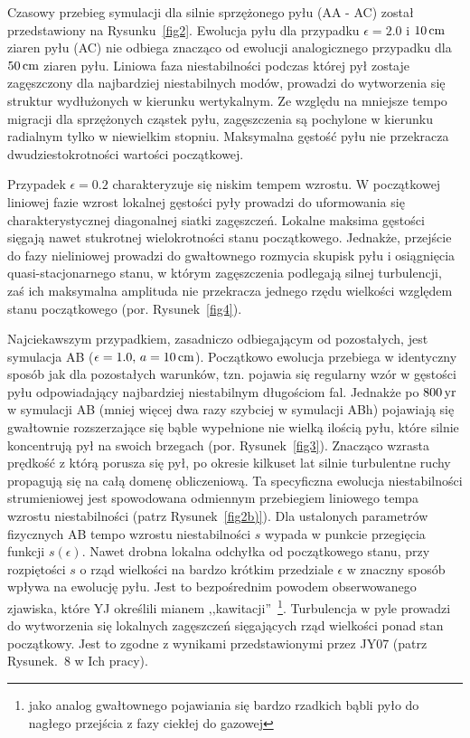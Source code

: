 Czasowy przebieg symulacji dla silnie sprzężonego pyłu (AA - AC) został
przedstawiony na Rysunku~\ref{fig2}. Ewolucja pyłu dla przypadku $\epsilon =
2.0$ i $10\hbox{$\thinspace\textrm{cm}$}$ ziaren pyłu (AC) nie odbiega znacząco od ewolucji analogicznego
przypadku dla $50\hbox{$\thinspace\textrm{cm}$}$ ziaren pyłu. Liniowa faza niestabilności podczas której
pył zostaje zagęszczony dla najbardziej niestabilnych modów, prowadzi do
wytworzenia się struktur wydłużonych w kierunku wertykalnym. Ze względu na
mniejsze tempo migracji dla sprzężonych cząstek pyłu, zagęszczenia są pochylone
w kierunku radialnym tylko w niewielkim stopniu. Maksymalna gęstość pyłu nie
przekracza dwudziestokrotności wartości początkowej.
\par Przypadek $\epsilon = 0.2$ charakteryzuje się niskim tempem wzrostu. W
początkowej liniowej fazie wzrost lokalnej gęstości pyły prowadzi do uformowania
się charakterystycznej diagonalnej siatki zagęszczeń. Lokalne maksima gęstości
sięgają nawet stukrotnej wielokrotności stanu początkowego. Jednakże, przejście
do fazy nieliniowej prowadzi do gwałtownego rozmycia skupisk pyłu i osiągnięcia
quasi-stacjonarnego stanu, w którym zagęszczenia podlegają silnej turbulencji,
zaś ich maksymalna amplituda nie przekracza jednego rzędu wielkości względem
stanu początkowego (por. Rysunek~\ref{fig4}).

\par Najciekawszym przypadkiem, zasadniczo odbiegającym od pozostałych, jest
symulacja AB ($\epsilon=1.0,\, a=10\hbox{$\thinspace\textrm{cm}$}$). Początkowo ewolucja przebiega w
identyczny sposób jak dla pozostałych warunków, tzn. pojawia się regularny wzór
w gęstości pyłu odpowiadający najbardziej niestabilnym długościom fal. Jednakże 
po $800\hbox{$\thinspace\textrm{yr}$}$ w symulacji AB (mniej więcej dwa razy szybciej w symulacji ABh)
pojawiają się gwałtownie rozszerzające się bąble wypełnione nie wielką ilością
pyłu, które silnie koncentrują pył na swoich brzegach (por. Rysunek~\ref{fig3}). 
Znacząco wzrasta prędkość z którą porusza się pył, po okresie kilkuset lat
silnie turbulentne ruchy propagują się na całą domenę obliczeniową. Ta
specyficzna ewolucja niestabilności strumieniowej jest spowodowana odmiennym
przebiegiem liniowego tempa wzrostu niestabilności (patrz Rysunek~\ref{fig2b)}).
Dla ustalonych parametrów fizycznych AB tempo wzrostu niestabilności $s$ wypada w
punkcie przegięcia funkcji $s(\epsilon)$. Nawet drobna lokalna odchyłka od
początkowego stanu, przy rozpiętości $s$ o rząd wielkości na bardzo krótkim
przedziale $\epsilon$ w znaczny sposób wpływa na ewolucję pyłu. Jest to
bezpośrednim powodem obserwowanego zjawiska, które YJ określili mianem
,,kawitacji''~\footnote{jako analog gwałtownego pojawiania się bardzo rzadkich
   bąbli pyło do nagłego przejścia z fazy ciekłej do gazowej}.
Turbulencja w pyle prowadzi do wytworzenia się lokalnych zagęszczeń sięgających
rząd wielkości ponad stan początkowy. Jest to zgodne z wynikami przedstawionymi
przez JY07 (patrz Rysunek.~8 w Ich pracy).

